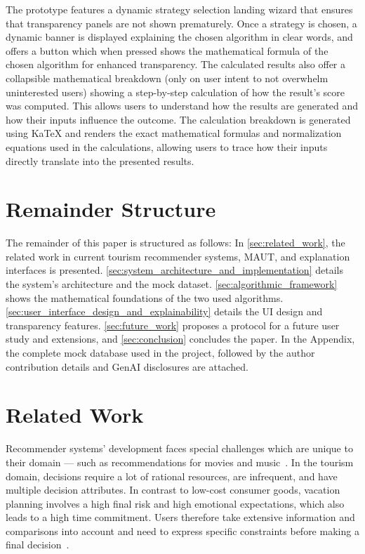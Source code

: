 \documentclass[acmlarge]{acmart}
\begin{document}
The prototype features a dynamic strategy selection landing wizard that ensures that transparency panels are not shown prematurely. Once a strategy is chosen, a dynamic banner is displayed explaining the chosen algorithm in clear words, and offers a button which when pressed shows the mathematical formula of the chosen algorithm for enhanced transparency. The calculated results also offer a collapsible mathematical breakdown (only on user intent to not overwhelm uninterested users) showing a step-by-step calculation of how the result's score was computed. This allows users to understand how the results are generated and how their inputs influence the outcome. The calculation breakdown is generated using KaTeX and renders the exact mathematical formulas and normalization equations used in the calculations, allowing users to trace how their inputs directly translate into the presented results.

\section{Remainder Structure}
The remainder of this paper is structured as follows: In \autoref{sec:related_work}, the related work in current tourism recommender systems, MAUT, and explanation interfaces is presented. \autoref{sec:system_architecture_and_implementation} details the system's architecture and the mock dataset. \autoref{sec:algorithmic_framework} shows the mathematical foundations of the two used algorithms. \autoref{sec:user_interface_design_and_explainability} details the UI design and transparency features. \autoref{sec:future_work} proposes a protocol for a future user study and extensions, and \autoref{sec:conclusion} concludes the paper. In the Appendix, the complete mock database used in the project, followed by the author contribution details and GenAI disclosures are attached.

\section{Related Work}\label{sec:related_work}
Recommender systems' development faces special challenges which are unique to their domain --- such as recommendations for movies and music~\cite{BORRAS20147370}. In the tourism domain, decisions require a lot of rational resources, are infrequent, and have multiple decision attributes. In contrast to low-cost consumer goods, vacation planning involves a high final risk and high emotional expectations, which also leads to a high time commitment. Users therefore take extensive information and comparisons into account and need to express specific constraints before making a final decision~\cite{ricci2011travel}.
\end{document}
